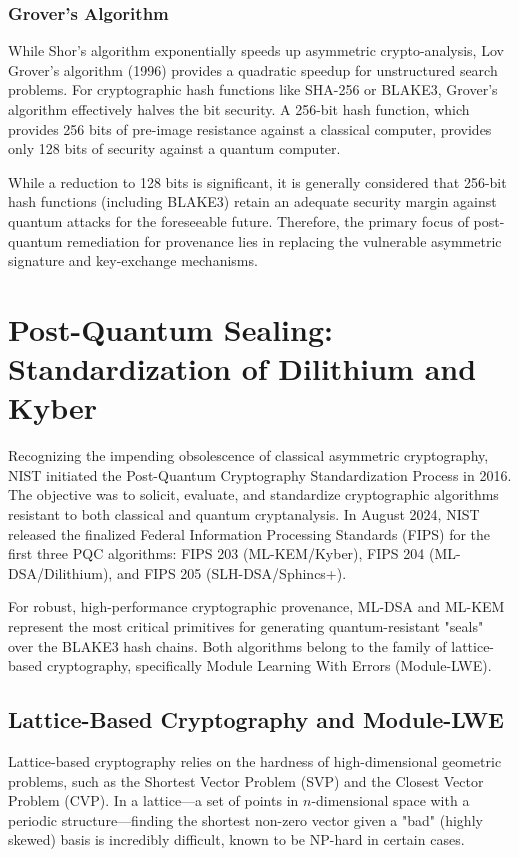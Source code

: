 \subsubsection{Grover's Algorithm}
While Shor's algorithm exponentially speeds up asymmetric crypto-analysis, Lov Grover's algorithm (1996) provides a quadratic speedup for unstructured search problems. For cryptographic hash functions like SHA-256 or BLAKE3, Grover's algorithm effectively halves the bit security. A 256-bit hash function, which provides 256 bits of pre-image resistance against a classical computer, provides only 128 bits of security against a quantum computer. 

While a reduction to 128 bits is significant, it is generally considered that 256-bit hash functions (including BLAKE3) retain an adequate security margin against quantum attacks for the foreseeable future. Therefore, the primary focus of post-quantum remediation for provenance lies in replacing the vulnerable asymmetric signature and key-exchange mechanisms.

\section{Post-Quantum Sealing: Standardization of Dilithium and Kyber}
\label{sec:pqc_standardization}

Recognizing the impending obsolescence of classical asymmetric cryptography, NIST initiated the Post-Quantum Cryptography Standardization Process in 2016. The objective was to solicit, evaluate, and standardize cryptographic algorithms resistant to both classical and quantum cryptanalysis. In August 2024, NIST released the finalized Federal Information Processing Standards (FIPS) for the first three PQC algorithms: FIPS 203 (ML-KEM/Kyber), FIPS 204 (ML-DSA/Dilithium), and FIPS 205 (SLH-DSA/Sphincs+).

For robust, high-performance cryptographic provenance, ML-DSA and ML-KEM represent the most critical primitives for generating quantum-resistant "seals" over the BLAKE3 hash chains. Both algorithms belong to the family of lattice-based cryptography, specifically Module Learning With Errors (Module-LWE).

\subsection{Lattice-Based Cryptography and Module-LWE}
Lattice-based cryptography relies on the hardness of high-dimensional geometric problems, such as the Shortest Vector Problem (SVP) and the Closest Vector Problem (CVP). In a lattice—a set of points in $n$-dimensional space with a periodic structure—finding the shortest non-zero vector given a "bad" (highly skewed) basis is incredibly difficult, known to be NP-hard in certain cases.

